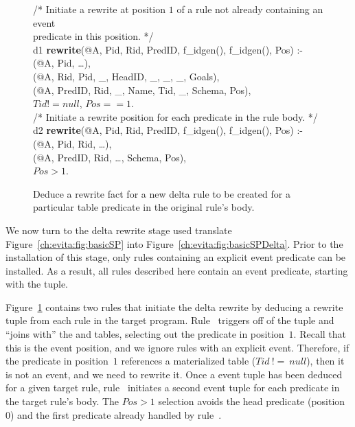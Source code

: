 \begin{figure}[!t]
\ssp
\centering
\begin{boxedminipage}{\linewidth}
/* Initiate a rewrite at position $1$ of a rule not already containing an event \\
   predicate in this position. */ \\
d1 {\bf rewrite}(@A, Pid, Rid, PredID, f\_idgen(), f\_idgen(), Pos) :- \\
(@A, Pid, \ldots), \\
(@A, Rid, Pid, \_, HeadID, \_, \_, \_, Goals), \\
(@A, PredID, Rid, \_, Name, Tid, \_, Schema, Pos), \\
\datalogspace $Tid != null$, $Pos == 1$. \\

/* Initiate a rewrite position for each predicate in the rule body. */ \\
d2 {\bf rewrite}(@A, Pid, Rid, PredID, f\_idgen(), f\_idgen(), Pos) :- \\
(@A, Pid, Rid, \ldots), \\
(@A, PredID, Rid, \ldots, Schema, Pos), \\
\datalogspace $Pos > 1$. \\

\end{boxedminipage}
\caption{\label{ch:evita:fig:delta1}Deduce a rewrite fact for a new delta rule to be
created for a particular table predicate in the original rule's body.}
\end{figure}

We now turn to the delta rewrite \OVERLOG stage used translate
Figure~\ref{ch:evita:fig:basicSP} into Figure~\ref{ch:evita:fig:basicSPDelta}.
Prior to the installation of this stage, only rules containing an explicit
event predicate can be installed.  As a result, all rules described here
contain an event predicate, starting with the  tuple.

Figure~\ref{ch:evita:fig:delta1} contains two rules that initiate the delta
rewrite by deducing a rewrite tuple from each rule in the target program.
Rule~ triggers off of the  tuple and ``joins
with'' the  and  tables, selecting out the predicate in
position~$1$.  Recall that this is the event position, and we ignore rules with
an explicit event.  Therefore, if the predicate in position~$1$ references a
materialized table ($Tid\ !=\ null$), then it is not an event, and we need to
rewrite it.  Once a  event tuple has been deduced for a given
target rule, rule~ initiates a second  event tuple for each
predicate in the target rule's body.  The $Pos > 1$ selection avoids the head
predicate (position $0$) and the first predicate already handled by
rule~.


